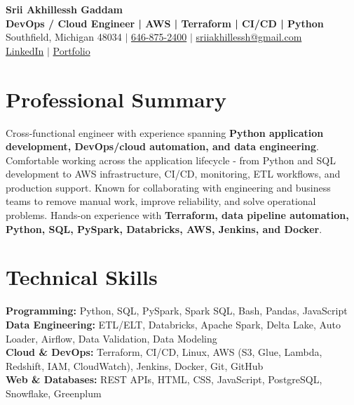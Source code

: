 \documentclass[letterpaper,10pt]{article}
\begin{document}
\fontsize{9.35pt}{10.45pt}\selectfont

\begin{center}
    {\LARGE \textbf{Srii Akhillessh Gaddam}} \\[-1pt]
    \textbf{DevOps / Cloud Engineer | AWS | Terraform | CI/CD | Python} \\[2pt]
    Southfield, Michigan 48034 $|$
    \href{tel:6468752400}{646-875-2400} $|$
    \href{mailto:sriiakhillessh@gmail.com}{sriiakhillessh@gmail.com} \\[1pt]
    \href{https://www.linkedin.com/in/srii-akhiilessh-gaddam-b48668191/}{LinkedIn} $|$
    \href{https://sriiakhillesshg.github.io/portfolio/}{Portfolio}
\end{center}
\vspace{-8pt}

\section{Professional Summary}
\small{Cross-functional engineer with experience spanning \textbf{Python application development, DevOps/cloud automation, and data engineering}. Comfortable working across the application lifecycle - from Python and SQL development to AWS infrastructure, CI/CD, monitoring, ETL workflows, and production support. Known for collaborating with engineering and business teams to remove manual work, improve reliability, and solve operational problems. Hands-on experience with \textbf{Terraform, data pipeline automation, Python, SQL, PySpark, Databricks, AWS, Jenkins, and Docker}.}

\section{Technical Skills}
\small{
\textbf{Programming:} Python, SQL, PySpark, Spark SQL, Bash, Pandas, JavaScript \\
\textbf{Data Engineering:} ETL/ELT, Databricks, Apache Spark, Delta Lake, Auto Loader, Airflow, Data Validation, Data Modeling \\
\textbf{Cloud \& DevOps:} Terraform, CI/CD, Linux, AWS (S3, Glue, Lambda, Redshift, IAM, CloudWatch), Jenkins, Docker, Git, GitHub \\
\textbf{Web \& Databases:} REST APIs, HTML, CSS, JavaScript, PostgreSQL, Snowflake, Greenplum
}
\end{document}
